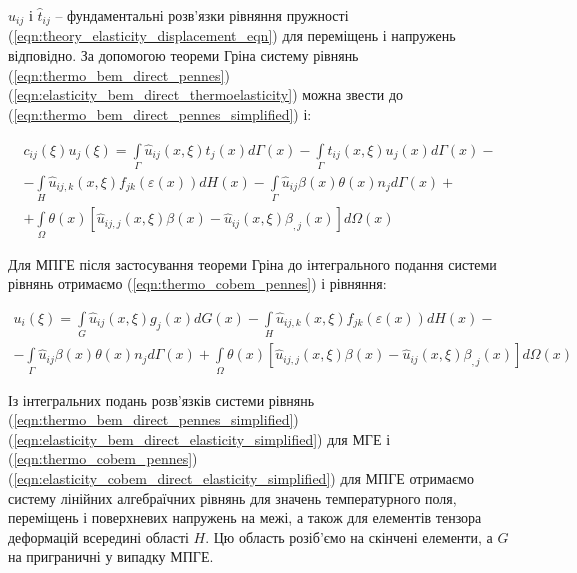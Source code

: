 \noindent$\hat{u}_{ij}$ і $\hat{t}_{ij}$ -- фундаментальні розв'язки рівняння пружності
(\ref{eqn:theory_elasticity_displacement_eqn}) для переміщень і напружень відповідно. За допомогою теореми Гріна систему
рівнянь (\ref{eqn:thermo_bem_direct_pennes})(\ref{eqn:elasticity_bem_direct_thermoelasticity}) можна звести до
(\ref{eqn:thermo_bem_direct_pennes_simplified}) і:

\begin{equation}
  \label{eqn:elasticity_bem_direct_thermoelasticity_simplified}
  \begin{split}
    c_{ij}(\xi) u_j(\xi) = \int \limits_{\Gamma}\hat{u}_{ij}(x,\xi)t_j(x)d\Gamma(x) - 
        \int \limits_{\Gamma}\hat{t}_{ij}(x,\xi)u_j(x)d\Gamma(x) - \\ 
        - \int \limits_H \hat{u}_{ij,k}(x,\xi)f_{jk}(\varepsilon(x))d H(x) 
        - \int \limits_{\Gamma} \hat{u}_{ij} \beta(x) \theta (x) n_j d \Gamma(x) + \\
        + \int \limits_{\Omega} \theta(x) [\hat{u}_{ij,j}(x,\xi)\beta(x)-\hat{u}_{ij}(x,\xi)\beta_{,j}(x)]d\Omega(x)
      \end{split}
\end{equation}

Для МПГЕ після застосування теореми Гріна до інтегрального подання системи рівнянь отримаємо
(\ref{eqn:thermo_cobem_pennes}) і рівняння: 

\begin{equation}
  \label{eqn:thermoelasticity_cobem_direct_elasticity_simplified}
  \begin{split}
  u_i(\xi) = \int \limits_G \hat{u}_{ij}(x,\xi) g_j(x)d G(x)
      - \int \limits_H \hat{u}_{ij,k}(x,\xi)f_{jk}(\varepsilon(x))d H(x) - \\
      - \int \limits_{\Gamma} \hat{u}_{ij} \beta(x) \theta (x) n_j d \Gamma(x)
      + \int \limits_{\Omega} \theta(x) [\hat{u}_{ij,j}(x,\xi)\beta(x)-\hat{u}_{ij}(x,\xi)\beta_{,j}(x)]d\Omega(x)
  \end{split}
\end{equation}

Із інтегральних подань розв'язків системи рівнянь
(\ref{eqn:thermo_bem_direct_pennes_simplified})(\ref{eqn:elasticity_bem_direct_elasticity_simplified}) для МГЕ і
(\ref{eqn:thermo_cobem_pennes})(\ref{eqn:elasticity_cobem_direct_elasticity_simplified}) для МПГЕ отримаємо систему
лінійних алгебраїчних рівнянь для значень температурного поля, переміщень і поверхневих напружень на межі, а також для
елементів тензора деформацій всередині області $H$. Цю область розіб'ємо на скінчені елементи, а $G$ на приграничні у
випадку МПГЕ.

